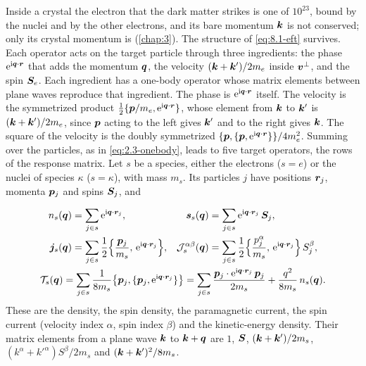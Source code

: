 Inside a crystal the electron that the dark matter strikes is one of $10^{23}$, bound by the nuclei and by the other electrons, and its bare momentum $\bm{k}$ is not conserved; only its crystal momentum is (\cref{chap:3}). The structure of \cref{eq:8.1-eft} survives. Each operator acts on the target particle through three ingredients: the phase $\mathrm{e}^{\mathrm{i}\bm{q}\cdot\bm{r}}$ that adds the momentum $\bm{q}$, the velocity $(\bm{k} + \bm{k}')/2m_e$ inside $\bm{v}^\perp$, and the spin $\bm{S}_e$. Each ingredient has a one-body operator whose matrix elements between plane waves reproduce that ingredient. The phase is $\mathrm{e}^{\mathrm{i}\bm{q}\cdot\bm{r}}$ itself. The velocity is the symmetrized product $\tfrac12\{\bm{p}/m_e, \mathrm{e}^{\mathrm{i}\bm{q}\cdot\bm{r}}\}$, whose element from $\bm{k}$ to $\bm{k}'$ is $(\bm{k} + \bm{k}')/2m_e$, since $\bm{p}$ acting to the left gives $\bm{k}'$ and to the right gives $\bm{k}$. The square of the velocity is the doubly symmetrized $\{\bm{p}, \{\bm{p}, \mathrm{e}^{\mathrm{i}\bm{q}\cdot\bm{r}}\}\}/4m_e^2$. Summing over the particles, as in \cref{eq:2.3-onebody}, leads to five target operators, the rows of the response matrix. Let $s$ be a species, either the electrons ($s = e$) or the nuclei of species $\kappa$ ($s = \kappa$), with mass $m_s$. Its particles $j$ have positions $\bm{r}_j$, momenta $\bm{p}_j$ and spins $\bm{S}_j$, and
\begin{keyresult}
\begin{equation}
  \begin{gathered}
  \begin{aligned}
  n_s(\bm{q}) &= \sum_{j\in s}\mathrm{e}^{\mathrm{i}\bm{q}\cdot\bm{r}_j}, &
  \bm{s}_s(\bm{q}) &= \sum_{j\in s}\mathrm{e}^{\mathrm{i}\bm{q}\cdot\bm{r}_j}\,\bm{S}_j, \\
  \bm{j}_s(\bm{q}) &= \sum_{j\in s}\frac12\Bigl\{\frac{\bm{p}_j}{m_s},\,\mathrm{e}^{\mathrm{i}\bm{q}\cdot\bm{r}_j}\Bigr\}, &
  \mathcal{J}^{\alpha\beta}_s(\bm{q}) &= \sum_{j\in s}\frac12\Bigl\{\frac{p^\alpha_j}{m_s},\,\mathrm{e}^{\mathrm{i}\bm{q}\cdot\bm{r}_j}\Bigr\}\,S^\beta_j,
  \end{aligned}\\
  \mathcal{T}_s(\bm{q}) = \sum_{j\in s}\frac{1}{8m_s}\bigl\{\bm{p}_j, \{\bm{p}_j, \mathrm{e}^{\mathrm{i}\bm{q}\cdot\bm{r}_j}\}\bigr\}
  = \sum_{j\in s}\frac{\bm{p}_j\cdot\mathrm{e}^{\mathrm{i}\bm{q}\cdot\bm{r}_j}\,\bm{p}_j}{2m_s} + \frac{q^2}{8m_s}\,n_s(\bm{q}) .
  \end{gathered}
  \label{eq:8.1-rows}
\end{equation}
These are the density, the spin density, the paramagnetic current, the spin current (velocity index $\alpha$, spin index $\beta$) and the kinetic-energy density. Their matrix elements from a plane wave $\bm{k}$ to $\bm{k} + \bm{q}$ are $1$, $\bm{S}$, $(\bm{k} + \bm{k}')/2m_s$, $(k^\alpha + k'^\alpha)S^\beta/2m_s$ and $(\bm{k} + \bm{k}')^2/8m_s$.
\end{keyresult}
